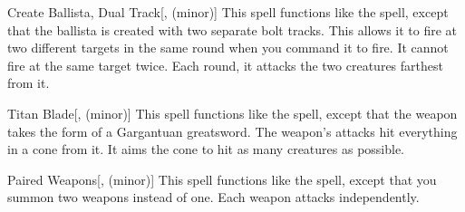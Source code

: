 \lowercase{\hypertarget{spell:Create Ballista, Dual Track}{}}\label{spell:Create Ballista, Dual Track}
\begin{apability}[\nth{4}]{\hypertarget{spell:Create Ballista, Dual Track}{Create Ballista, Dual Track}}[,  (minor)]
This spell functions like the  spell, except that the ballista is created with two separate bolt tracks.
This allows it to fire at two different targets in the same round when you command it to fire.
It cannot fire at the same target twice.
Each round, it attacks the two creatures farthest from it.
\end{apability}
\vspace{0.25em}



\lowercase{\hypertarget{spell:Titan Blade}{}}\label{spell:Titan Blade}
\begin{apability}[\nth{6}]{\hypertarget{spell:Titan Blade}{Titan Blade}}[,  (minor)]
This spell functions like the  spell, except that the weapon takes the form of a Gargantuan greatsword.
The weapon's attacks hit everything in a \areamed cone from it.
It aims the cone to hit as many creatures as possible.
\end{apability}
\vspace{0.25em}



\lowercase{\hypertarget{spell:Paired Weapons}{}}\label{spell:Paired Weapons}
\begin{apability}[\nth{7}]{\hypertarget{spell:Paired Weapons}{Paired Weapons}}[,  (minor)]
This spell functions like the  spell, except that you summon two weapons instead of one.
Each weapon attacks independently.
\end{apability}
\vspace{0.25em}

